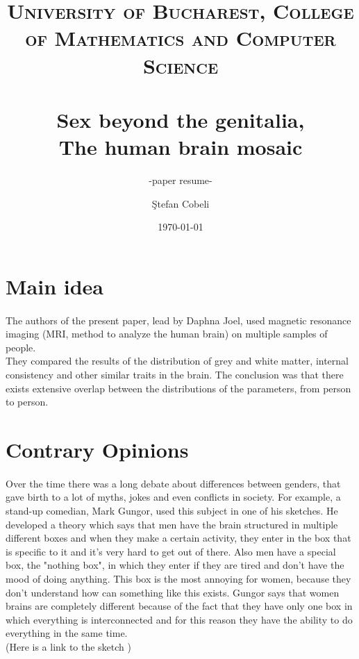 \documentclass[paper=a4, fontsize=11pt]{scrartcl} %
\title{	
\normalfont \normalsize 
\textsc{University of Bucharest, College of Mathematics and Computer Science  } \\ [25pt] %
\horrule{0.5pt} \\[0.4cm] %
\huge Sex beyond the genitalia,\\ The human brain mosaic 
\horrule{2pt} \\[0.5cm] %
}
\subtitle{-paper resume-}
\author{\c Stefan Cobeli} %
\date{\normalsize\today} %
\numberwithin{equation}{section} %
\numberwithin{figure}{section} %
\numberwithin{table}{section} %
\begin{document}
\maketitle %


\section{Main idea}
\paragraph{}

	The authors of the present paper, lead by Daphna Joel, used magnetic resonance\\ imaging (MRI, method to analyze the human brain) on multiple samples of people.\\ They compared the results of the distribution of grey and white matter, internal consistency and other similar traits in the brain. The conclusion was that there exists extensive overlap between the distributions of the parameters, from person to person. 

\section{Contrary Opinions}
	\paragraph{}
		Over the time there was a long debate about differences between genders, that gave birth to a lot of myths, jokes and even conflicts in society. 
		For example, a stand-up comedian, Mark Gungor, used this subject in one of his sketches. He developed a theory which says that men have the brain structured in multiple different boxes and when they make a certain activity, they enter in the box that is specific to it and it's very hard to get out of there. Also men have a special box, the "nothing box", in which they enter if they are tired and don't have the mood of doing anything. This box is the most annoying for women, because they don't understand how can something like this exists. Gungor says that women brains are completely different because of the fact that they have only one box in which everything is interconnected and for this reason they have the ability to do everything in the same time.\\
		(Here is a link to the sketch \cite{NthB})
				
\end{document}
